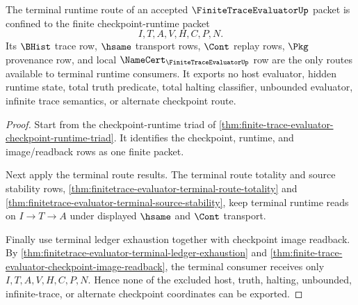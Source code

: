 \begin{theorem}
\label{thm:finite-trace-evaluator-terminal-runtime-nonescape}
The terminal runtime route of an accepted $\FiniteTraceEvaluatorUp$ packet is
confined to the finite checkpoint-runtime packet
$$
I,T,A,V,H,C,P,N.
$$
Its $\BHist$ trace row, $\hsame$ transport rows, $\Cont$ replay rows, $\Pkg$
provenance row, and local $\NameCert_{\FiniteTraceEvaluatorUp}$ row are the
only routes available to terminal runtime consumers. It exports no host
evaluator, hidden runtime state, total truth predicate, total halting
classifier, unbounded evaluator, infinite trace semantics, or alternate
checkpoint route.
\end{theorem}
\begin{proof}
Start from the checkpoint-runtime triad of
\autoref{thm:finite-trace-evaluator-checkpoint-runtime-triad}. It identifies
the checkpoint, runtime, and image/readback rows as one finite packet.

Next apply the terminal route results. The terminal route totality and source
stability rows,
\autoref{thm:finitetrace-evaluator-terminal-route-totality} and
\autoref{thm:finitetrace-evaluator-terminal-source-stability}, keep terminal
runtime reads on $I \to T \to A$ under displayed $\hsame$ and $\Cont$
transport.

Finally use terminal ledger exhaustion together with checkpoint image
readback. By
\autoref{thm:finitetrace-evaluator-terminal-ledger-exhaustion} and
\autoref{thm:finite-trace-evaluator-checkpoint-image-readback}, the terminal
consumer receives only $I,T,A,V,H,C,P,N$. Hence none of the excluded host,
truth, halting, unbounded, infinite-trace, or alternate checkpoint coordinates
can be exported.
\end{proof}
